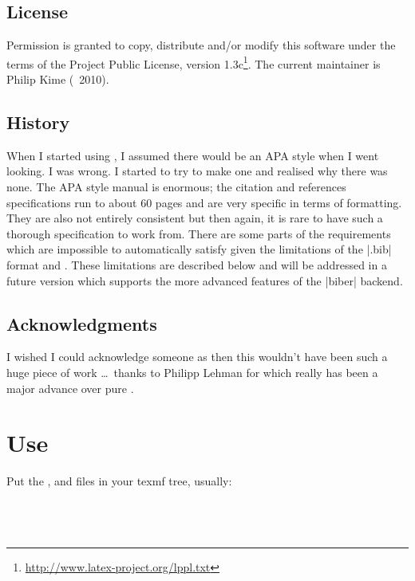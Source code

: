 \documentclass{ltxdockit}
\begin{document}
\subsection{License}

Permission is granted to copy, distribute and/or modify this software under
the terms of the \latex Project Public License, version
1.3c\footnote{\url{http://www.latex-project.org/lppl.txt}}. The current
maintainer is Philip Kime (\textcopyright\ 2010).

\subsection{History}

When I started using , I assumed there would be an APA style
when I went looking. I was wrong. I started to try to make one and realised
why there was none. The APA style manual is enormous; the citation and
references specifications run to about 60 pages and are very specific in
terms of formatting. They are also not entirely consistent but then again,
it is rare to have such a thorough specification to work from. There are
some parts of the requirements which are impossible to automatically
satisfy given the limitations of the |.bib| format and \bibtex. These
limitations are described below and will be addressed in a future
 version which supports the more advanced features of the
|biber| backend.

\subsection{Acknowledgments}

I wished I could acknowledge someone as then this wouldn't have been such a
huge piece of work \ldots\ thanks to Philipp Lehman for  which
really has been a major advance over pure \bibtex.

\section{Use}\label{ref:use}
\label{use}
Put the ,  and  files in your texmf tree, usually:\\

\noindent{}\\
\\
\\
\end{document}
